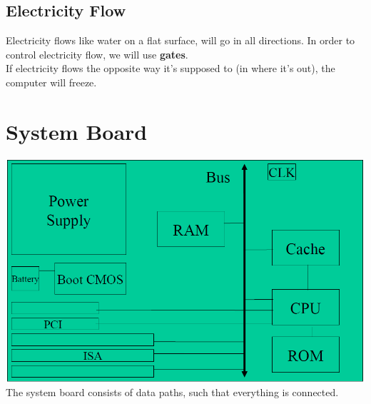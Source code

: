 \documentclass[12 pt]{article}
\begin{document}
	\subsection{Electricity Flow}
	Electricity flows like water on a flat surface, will go in all directions. In order to control electricity flow, we will use \textbf{gates}.
	\\ If electricity flows the opposite way it's supposed to (in where it's out), the computer will freeze.
	\section{System Board}
	\includegraphics[scale=0.5]{sb.png}\\
	The system board consists of data paths, such that everything is connected.
\end{document}
